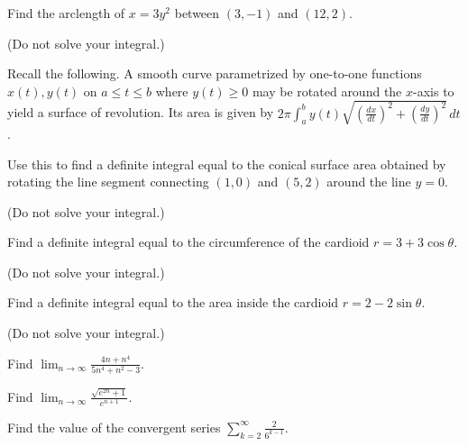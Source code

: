 \documentclass[12pt]{article}
\begin{document}
Find the arclength of \(x=3y^2\) between \((3,-1)\) and \((12,2)\).

(Do not solve your integral.)


Recall the following.
A smooth curve parametrized by one-to-one functions
\(x(t),y(t)\) on \(a\leq t\leq b\) where
\(y(t)\geq 0\) may be rotated around the \(x\)-axis to yield a surface of
revolution. Its area is given by
\(2\pi\int_{a}^{b}y(t)\sqrt{(\frac{dx}{dt})^2+(\frac{dy}{dt})^2}\,dt\).

Use this to find
a definite integral equal to the conical surface area obtained by
rotating the line segment connecting \((1,0)\) and \((5,2)\) around the
line \(y=0\).

(Do not solve your integral.)




Find a definite integral equal to the circumference of the cardioid
\(r=3+3\cos\theta\).

(Do not solve your integral.)


Find a definite integral equal to the area inside the cardioid
\(r=2-2\sin\theta\).

(Do not solve your integral.)



\newpage




Find \(\displaystyle\lim_{n\to\infty}\frac{4n+n^4}{5n^4+n^2-3}\).


Find \(\displaystyle\lim_{n\to\infty}\frac{\sqrt{e^{2n}+1}}{e^{n+1}}\).




Find the value of the convergent series
\(\sum_{k=2}^\infty \frac{2}{6^{k-1}}\).
\end{document}
